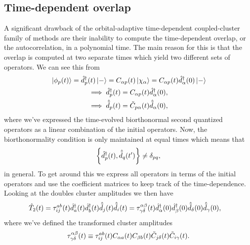         \subsection{Time-dependent overlap}
            A significant drawback of the orbital-adaptive time-dependent
            coupled-cluster family of methods are their inability to compute the
            time-dependent overlap, or the autocorrelation, in a polynomial
            time.
            The main reason for this is that the overlap is computed at two
            separate times which yield two different sets of operators.
            We can see this from
            \begin{gather}
                \ket*{\phi_p(t)}
                = \hat{d}^{\dagger}_{p}(t)\ket*{-}
                = C_{\alpha p}(t) \ket*{\chi_{\alpha}}
                = C_{\alpha p}(t) \hat{d}^{\dagger}_{\alpha}(0)\ket*{-}
                \\
                \implies
                \hat{d}^{\dagger}_{p}(t) = C_{\alpha p}(t) \hat{d}^{\dagger}_{\alpha}(0),
                \\
                \implies
                \hat{\tilde{d}}_{p}(t) = \tilde{C}_{p \alpha}(t) \hat{\tilde{d}}_{\alpha}(0),
            \end{gather}
            where we've expressed the time-evolved biorthonormal second
            quantized operators as a linear combination of the initial
            operators.
            Now, the biorthonormality condition is only maintained at equal
            times which means that
            \begin{align}
                \left\{\hat{d}^{\dagger}_{p}(t), \hat{\tilde{d}}_{q}(t')\right\} \neq \delta_{pq},
            \end{align}
            in general.
            To get around this we express all operators in terms of the initial
            operators and use the coefficient matrices to keep track of the
            time-dependence.
            Looking at the doubles cluster amplitudes we then have
            \begin{align}
                \hat{T}_2(t)
                &= \tau^{ab}_{ij}(t)
                \hat{d}^{\dagger}_{a}(t)\hat{d}^{\dagger}_{b}(t)\hat{\tilde{d}}_{j}(t)\hat{\tilde{d}}_{i}(t)
                = \tau^{\alpha \beta}_{\gamma \delta}(t)
                \hat{d}^{\dagger}_{\alpha}(0)\hat{d}^{\dagger}_{\beta}(0)
                \hat{\tilde{d}}_{\delta}(0)\hat{\tilde{d}}_{\gamma}(0),
                \label{eq:transformed-cluster-operator}
            \end{align}
            where we've defined the transformed cluster amplitudes
            \begin{align}
                \tau^{\alpha \beta}_{\gamma \delta}(t)
                \equiv
                \tau^{ab}_{ij}(t)
                C_{\alpha a}(t)
                C_{\beta b}(t)
                \tilde{C}_{j\delta}(t)
                \tilde{C}_{i\gamma}(t).
            \end{align}
